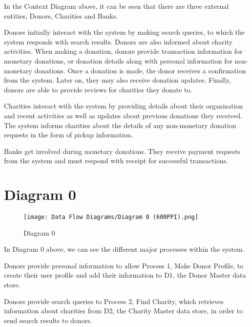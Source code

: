 \documentclass{scrreprt}
\begin{document}
        In the Context Diagram above, it can be seen that there are three external entities, Donors, Charities and Banks.\par
        
        Donors initially interact with the system by making search queries, to which the system responds with search results. Donors are also informed about charity activities. When making a donation, donors provide transaction information for monetary donations, or donation details along with personal information for non-monetary donations. Once a donation is made, the donor receives a confirmation from the system. Later on, they may also receive donation updates. Finally, donors are able to provide reviews for charities they donate to.\par
        
        Charities interact with the system by providing details about their organization and recent activities as well as updates about previous donations they received. The system informs charities about the details of any non-monetary donation requests in the form of pickup information.\par
        
        Banks get involved during monetary donations. They receive payment requests from the system and must respond with receipt for successful transactions.
    
    \section{Diagram 0}
    
        \begin{figure}[H]
            \centering
            \texttt{[image: Data Flow Diagrams/Diagram 0 (600PPI).png]}
            {\caption*{Diagram 0}}
        \end{figure}
        
        In Diagram 0 above, we can see the different major processes within the system.
        
        Donors provide personal information to allow Process 1, Make Donor Profile, to create their user profile and add their information to D1, the Donor Master data store.\par
        
        Donors provide search queries to Process 2, Find Charity, which retrieves information about charities from D2, the Charity Master data store, in order to send search results to donors.\par
        
\end{document}
